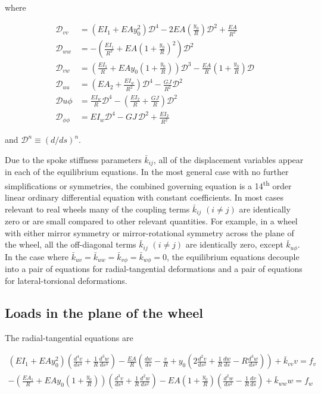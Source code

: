 \documentclass[../thesis.tex]{subfiles}
\newcommand{\D}{\mathcal{D}}
\newcommand{\ds}[2]{\frac{d^#2#1}{ds^#2}}
\begin{document}
where

\begin{align*}
\D_{vv} &= (EI_1 + EAy_0^2)\D^4 - 2EA\left(\frac{y_0}{R}\right)\D^2 + \frac{EA}{R^2}\\
\D_{ww} &= -\left(\frac{EI_1}{R^2} + EA\left(1+\frac{y_0}{R}\right)^2\right)\D^2\\
\D_{vw} &= \left(\frac{EI_1}{R} + EAy_0\left(1+\frac{y_0}{R}\right)\right)\D^3 - \frac{EA}{R}\left(1+\frac{y_0}{R}\right)\D\\
\D_{uu} &= \left(EA_2 + \frac{EI_w}{R^2}\right)\D^4 - \frac{GJ}{R^2}\D^2\\
\D {u\phi} &= \frac{EI_w}{R}\D^4 - \left(\frac{EI_2}{R} + \frac{GJ}{R}\right)\D^2\\
\D_{\phi\phi} &= EI_w\D^4 - GJ\,\D^2 + \frac{EI_2}{R^2}
\end{align*}

and $\D^n \equiv (d/ds)^n$.

Due to the spoke stiffness parameters $\bar{k}_{ij}$, all of the displacement variables appear in each of the equilibrium equations. In the most general case with no further simplifications or symmetries, the combined governing equation is a 14\textsuperscript{th} order linear ordinary differential equation with constant coefficients. In most cases relevant to real wheels many of the coupling terms $\bar{k}_{ij}$ $(i \neq j)$ are identically zero or are small compared to other relevant quantities. For example, in a wheel with either mirror symmetry or mirror-rotational symmetry across the plane of the wheel, all the off-diagonal terms $\bar{k}_{ij}$ $(i \neq j)$ are identically zero, except $\bar{k}_{u\phi}$. In the case where $\bar{k}_{uv}=\bar{k}_{uw}=\bar{k}_{v\phi}=\bar{k}_{w\phi}=0$, the equilibrium equations decouple into a pair of equations for radial-tangential deformations and a pair of equations for lateral-torsional deformations.

\subsection{Loads in the plane of the wheel}

The radial-tangential equations are

\begin{subequations}
\begin{align}
\label{eq:rad_tan_2}
(EI_1 + EAy_0^2)\left( \ds{v}{4} + \frac{1}{R}\ds{w}{3} \right) -
    \frac{EA}{R}\left( \frac{dw}{ds} - \frac{v}{R} +y_0\left(2\ds{v}{2} + \frac{1}{R}\frac{dw}{ds} -
    R\ds{w}{3}\right) \right) +\bar{k}_{vv}v = f_v\\
-\left( \frac{EA_1}{R} + EAy_0\left( 1 + \frac{y_0}{R} \right) \right)
    \left(\ds{v}{3} + \frac{1}{R}\ds{w}{2} \right) -
    EA\left(1+\frac{y_0}{R} \right) \left(\ds{w}{2} - \frac{1}{R}\frac{dv}{ds} \right) + \bar{k}_{ww}w = f_w
\end{align}
\end{subequations}
\end{document}
